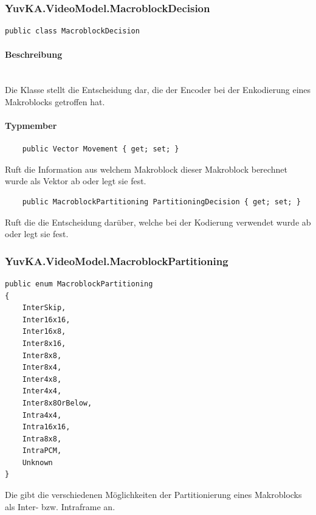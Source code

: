 \subsubsection{YuvKA.VideoModel.MacroblockDecision}

\begin{verbatim}
public class MacroblockDecision
\end{verbatim}

\paragraph{Beschreibung}~\\
Die Klasse  stellt die Entscheidung dar, die der Encoder bei der Enkodierung eines Makroblocks getroffen hat.

\paragraph{Typmember}
\begin{itemize}

	\begin{verbatim}
	public Vector Movement { get; set; }
	\end{verbatim}
	Ruft die Information aus welchem Makroblock dieser Makroblock berechnet wurde als Vektor ab oder legt sie fest.

	\begin{verbatim}
	public MacroblockPartitioning PartitioningDecision { get; set; }
	\end{verbatim}
	Ruft die die Entscheidung darüber, welche  bei der Kodierung verwendet wurde ab oder legt sie fest.

\end{itemize}

\subsubsection{YuvKA.VideoModel.MacroblockPartitioning}

\begin{verbatim}
public enum MacroblockPartitioning
{
    InterSkip,
    Inter16x16,
    Inter16x8,
    Inter8x16,
    Inter8x8,
    Inter8x4,
    Inter4x8,
    Inter4x4,
    Inter8x8OrBelow,
    Intra4x4,
    Intra16x16,
    Intra8x8,
    IntraPCM,
    Unknown
}
\end{verbatim}

Die  gibt die verschiedenen Möglichkeiten der Partitionierung eines Makroblocks als Inter- bzw. Intraframe an.
